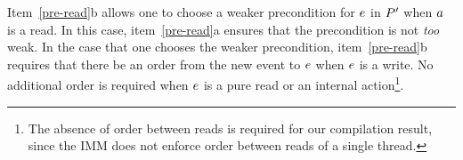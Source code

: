 \begin{definition}
\begin{enumerate}
\end{enumerate}
\end{definition}


Item~\ref{pre-read}b allows one to choose a weaker precondition for $e$ in
$P'$ when $a$ is a read.  In this case, item~\ref{pre-read}a ensures
that the precondition is not \emph{too} weak.  In the case that one chooses
the weaker precondition, item~\ref{pre-read}b requires that there be an order
from the new event to $e$ when $e$ is a write.  No additional order is
required when $e$ is a pure read or an internal action\footnote{The
  absence of order between reads is required for our compilation result,
  since the IMM does not enforce order between reads of a single thread.}.

